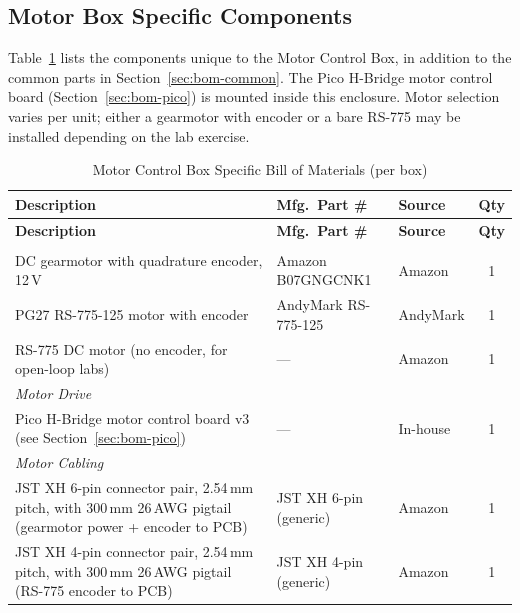 \documentclass[main.tex]{subfiles}
\begin{document}
\subsection{Motor Box Specific Components}
\label{sec:bom-motor-specific}

Table~\ref{tab:bom-motor} lists the components unique to the Motor Control Box, in addition to the common parts in Section~\ref{sec:bom-common}. The Pico H-Bridge motor control board (Section~\ref{sec:bom-pico}) is mounted inside this enclosure. Motor selection varies per unit; either a gearmotor with encoder or a bare RS-775 may be installed depending on the lab exercise.

\renewcommand{\arraystretch}{1.3}
\begin{longtable}{p{6.5cm} l l c}
\caption{Motor Control Box Specific Bill of Materials (per box)} \label{tab:bom-motor} \\
\hline
\textbf{Description} & \textbf{Mfg.\ Part \#} & \textbf{Source} & \textbf{Qty} \\
\hline
\endfirsthead
\hline
\textbf{Description} & \textbf{Mfg.\ Part \#} & \textbf{Source} & \textbf{Qty} \\
\hline
\endhead
\hline
\endfoot

\multicolumn{4}{l}{\textit{Motor (one of the following per box)}} \\
\hline
DC gearmotor with quadrature encoder, 12\,V & Amazon B07GNGCNK1 & Amazon & 1 \\
PG27 RS-775-125 motor with encoder & AndyMark RS-775-125 & AndyMark & 1 \\
RS-775 DC motor (no encoder, for open-loop labs) & --- & Amazon & 1 \\
\hline

\multicolumn{4}{l}{\textit{Motor Drive}} \\
\hline
Pico H-Bridge motor control board v3 (see Section~\ref{sec:bom-pico}) & --- & In-house & 1 \\
\hline

\multicolumn{4}{l}{\textit{Motor Cabling}} \\
\hline
JST XH 6-pin connector pair, 2.54\,mm pitch, with 300\,mm 26\,AWG pigtail (gearmotor power + encoder to PCB) & JST XH 6-pin (generic) & Amazon & 1 \\
JST XH 4-pin connector pair, 2.54\,mm pitch, with 300\,mm 26\,AWG pigtail (RS-775 encoder to PCB) & JST XH 4-pin (generic) & Amazon & 1 \\

\end{longtable}
\renewcommand{\arraystretch}{1}
\end{document}
